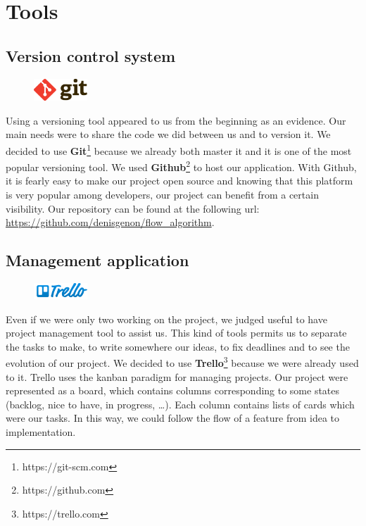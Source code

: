\section{Tools}

\subsection{Version control system}

\begin{figure}
	\vspace{-5mm}
	\includegraphics[width =2cm]{images/Git-logo.png}
\end{figure}

Using a versioning tool appeared to us from the beginning as an evidence. Our main needs were to share the code we did between us and to version it. We decided to use \textbf{Git}\footnote{https://git-scm.com} because we already both master it and it is one of the most popular versioning tool. We used \textbf{Github}\footnote{https://github.com} to host our application. With Github, it is fearly easy to make our project open source and knowing that this platform is very popular among developers, our project can benefit from a certain visibility. Our repository can be found at the following url: \url{https://github.com/denisgenon/flow_algorithm}.

\subsection{Management application}

\begin{figure}
	\vspace{-5mm}
	\includegraphics[width =2cm]{images/Trello_Logo.png}
\end{figure}


Even if we were only two working on the project, we judged useful to have project management tool to assist us. This kind of tools permits us to separate the tasks to make, to write somewhere our ideas, to fix deadlines and to see the evolution of our project. We decided to use \textbf{Trello}\footnote{https://trello.com} because we were already used to it. Trello uses the kanban paradigm for managing projects. Our project were represented as a board, which contains columns corresponding to some states (backlog, nice to have, in progress, \dots). Each column contains lists of cards which were our tasks. In this way, we could follow the flow of a feature from idea to implementation.

